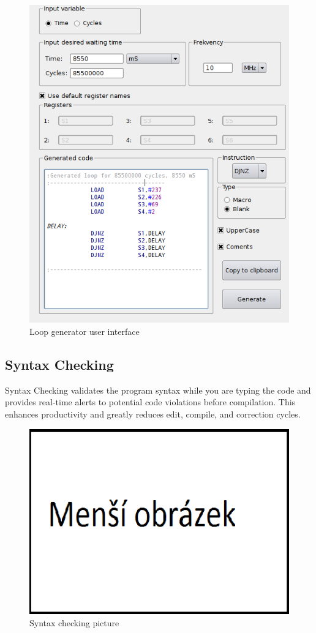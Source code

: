    \begin{figure}[h]
        \centering{}
        \includegraphics[width=.7\textwidth]{img/loop_gen.png}
        \caption{Loop generator user interface}
    \end{figure}
    
\subsection{Syntax Checking}
    Syntax Checking validates the program syntax while you are typing the code and provides real-time alerts to potential code violations before compilation. This enhances productivity and greatly reduces edit, compile, and correction cycles.
    \begin{figure}[h]
        \centering{}
        \includegraphics[scale=0.3]{img/mensi_obrazek.png}
        \caption{Syntax checking picture}
    \end{figure}

